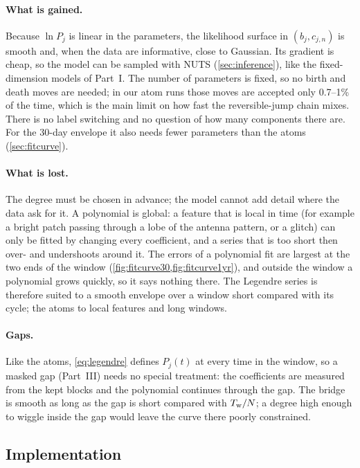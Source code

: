\documentclass[11pt,a4paper]{article}
\begin{document}
\paragraph{What is gained.} Because $\ln P_j$ is linear in the parameters, the
likelihood surface in $(b_j,c_{j,n})$ is smooth and, when the data are informative,
close to Gaussian. Its gradient is cheap, so the model can be sampled with NUTS
(\cref{sec:inference}), like the fixed-dimension models of Part~I. The number of
parameters is fixed, so no birth and death moves are needed; in our atom runs those
moves are accepted only 0.7--1\% of the time, which is the main limit on how fast the
reversible-jump chain mixes. There is no label switching and no question of how many
components there are. For the 30-day envelope it also needs fewer parameters than the
atoms (\cref{sec:fitcurve}).

\paragraph{What is lost.} The degree must be chosen in advance; the model cannot add
detail where the data ask for it. A polynomial is global: a feature that is local in
time (for example a bright patch passing through a lobe of the antenna pattern, or a
glitch) can only be fitted by changing every coefficient, and a series that is too
short then over- and undershoots around it. The errors of a polynomial fit are largest
at the two ends of the window (\cref{fig:fitcurve30,fig:fitcurve1yr}), and outside the
window a polynomial grows quickly, so it says nothing there. The Legendre series is
therefore suited to a smooth envelope over a window short compared with its cycle; the
atoms to local features and long windows.

\paragraph{Gaps.} Like the atoms, \cref{eq:legendre} defines $P_j(t)$ at every time
in the window, so a masked gap (Part~III) needs no special treatment: the
coefficients are measured from the kept blocks and the polynomial continues through
the gap. The bridge is smooth as long as the gap is short compared with
$T_{\rm w}/N$; a degree high enough to wiggle inside the gap would leave the curve
there poorly constrained.

\subsection{Implementation}
\end{document}
